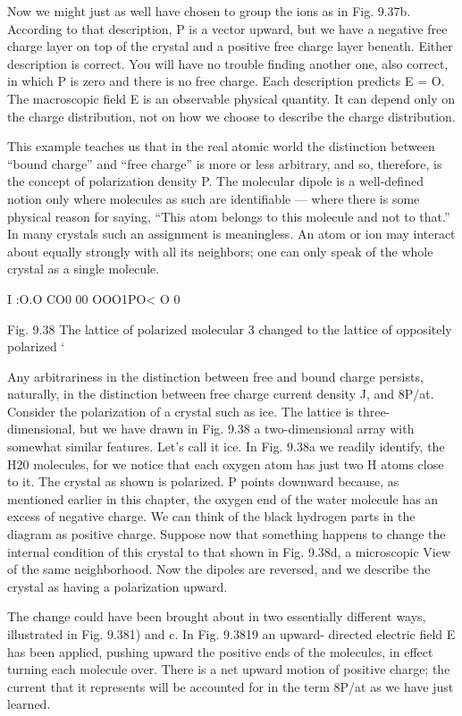 {{{{Now we might just as well have chosen to group the ions as in
Fig. 9.37b. According to that description, P is a vector upward, but
we have a negative free charge layer on top of the crystal and a positive
free charge layer beneath. Either description is correct. You will
have no trouble finding another one, also correct, in which P is zero
and there is no free charge. Each description predicts E = O. The
macroscopic field E is an observable physical quantity. It can depend
only on the charge distribution, not on how we choose to describe
the charge distribution.

This example teaches us that in the real atomic world the distinction
between ``bound charge'' and ``free charge'' is more or less
arbitrary, and so, therefore, is the concept of polarization density P.
The molecular dipole is a well-defined notion only where molecules
as such are identifiable --- where there is some physical reason for
saying, ``This atom belongs to this molecule and not to that.'' In
many crystals such an assignment is meaningless. An atom or ion
may interact about equally strongly with all its neighbors; one can
only speak of the whole crystal as a single molecule.

I :O.O CO0
00 OOO1PO<
O 0

Fig. 9.38 The lattice of polarized molecular 3
changed to the lattice of oppositely polarized ‘

Any arbitrariness in the distinction between free and bound charge
persists, naturally, in the distinction between free charge current
density J, and 8P/at. Consider the polarization of a crystal such as
ice. The lattice is three-dimensional, but we have drawn in Fig. 9.38
a two-dimensional array with somewhat similar features. Let's call
it ice. In Fig. 9.38a we readily identify, the H20 molecules, for we
notice that each oxygen atom has just two H atoms close to it. The
crystal as shown is polarized. P points downward because, as mentioned
earlier in this chapter, the oxygen end of the water molecule
has an excess of negative charge. We can think of the black hydrogen
parts in the diagram as positive charge. Suppose now that something
happens to change the internal condition of this crystal to that
shown in Fig. 9.38d, a microscopic View of the same neighborhood.
Now the dipoles are reversed, and we describe the crystal as having
a polarization upward.

The change could have been brought about in two essentially different
ways, illustrated in Fig. 9.381) and c. In Fig. 9.3819 an upward-
directed electric field E has been applied, pushing upward the positive
ends of the molecules, in effect turning each molecule over.
There is a net upward motion of positive charge; the current that it
represents will be accounted for in the term 8P/at as we have just
learned.

}}}}
